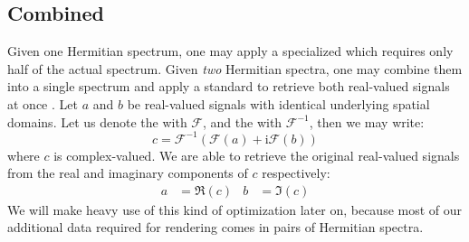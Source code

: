 \subsection{Combined \InvFourierTransform}
Given one Hermitian spectrum, one may apply a specialized \InvFourierTransform
which requires only half of the actual spectrum. Given \emph{two} Hermitian spectra,
one may combine them into a single spectrum and apply a standard \InvFourierTransform
to retrieve both real-valued signals at once \citep{fft:handbook}.
Let $a$ and $b$ be real-valued signals with identical underlying spatial domains.
Let us denote the \FourierTransform with $\mathcal{F}$, and the \InvFourierTransform
with $\mathcal{F}^{-1}$, then we may write:
\begin{equation}
\label{eq:idft:combined}
c = \mathcal{F}^{-1}(\mathcal{F}(a)+\mathrm{i}\mathcal{F}(b))
\end{equation}
where $c$ is complex-valued. We are able to retrieve the original real-valued
signals from the real and imaginary components of $c$ respectively:
\begin{align*}
a &= \Re(c) & b &= \Im(c)
\end{align*}
%
We will make heavy use of this kind of optimization later on, because most
of our additional data required for rendering comes in pairs of Hermitian spectra.
